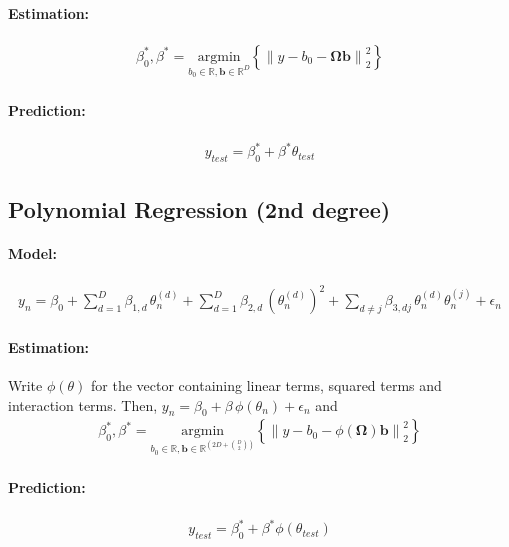 \documentclass[a4paper, 12pt]{article}
\newcommand{\norm}[1]{\left\lVert#1\right\rVert}
\begin{document}
\paragraph{Estimation:}

\begin{align}
  \beta_0^*, \beta^* = \underset{b_0 \in \mathbb{R}, \bm{b} \in \mathbb{R}^D}{\text{argmin}} \left\{  \norm{y - b_0 - \bm{\Omega} \bm{b}}_2^2 \right \}
\end{align}

\paragraph{Prediction:}
\begin{align}\label{eq:linear_prediction}
y_{test} = \beta_0^* + \beta^* \theta_{test}
\end{align}


\subsection{Polynomial Regression (2nd degree)}

\paragraph{Model:}
\begin{align}\label{eq:polynomial_model} y_n = \beta_0 + \sum_{d=1}^D \beta_{1,d} \, \theta_n^{(d)} + \sum_{d=1}^D \beta_{2,d} \, (\theta_n^{(d)})^2 + \sum_{d\neq j} \beta_{3,dj} \, \theta_n^{(d)} \theta_n^{(j)} + \epsilon_n
\end{align}

\paragraph{Estimation:}
Write $\phi(\theta)$ for the vector containing linear terms, squared terms and interaction terms.
Then, $y_n = \beta_0 + \beta \, \phi(\theta_n) + \epsilon_n$ and
\begin{align}
  \beta_0^*, \beta^* = \underset{b_0 \in \mathbb{R}, \bm{b} \in \mathbb{R}^{(2D + {D \choose 2})}}{\text{argmin}} \left\{  \norm{y - b_0 - \phi(\bm{\Omega}) \bm{b}}_2^2 \right \}
\end{align}

\paragraph{Prediction:}
\begin{align}\label{eq:polynomial_prediction}
y_{test} = \beta_0^* + \beta^* \phi(\theta_{test})
\end{align}
\end{document}
